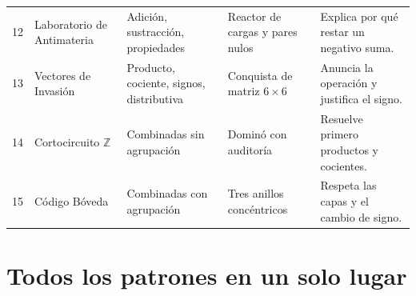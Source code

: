 \documentclass[12pt, letterpaper]{article}
\newcommand{\Z}{\mathbb{Z}}
\begin{document}
\begin{center}
\begin{tabular}{@{}c l p{3.0cm} p{3.4cm} p{3.6cm}@{}}
12 & Laboratorio de Antimateria & Adición, sustracción, propiedades & Reactor de cargas y pares nulos & Explica por qué restar un negativo suma.\\
13 & Vectores de Invasión & Producto, cociente, signos, distributiva & Conquista de matriz $6\times 6$ & Anuncia la operación y justifica el signo.\\
14 & Cortocircuito $\Z$ & Combinadas sin agrupación & Dominó con auditoría & Resuelve primero productos y cocientes.\\
15 & Código Bóveda & Combinadas con agrupación & Tres anillos concéntricos & Respeta las capas y el cambio de signo.\\
\bottomrule
\end{tabular}
\end{center}

\section{Todos los patrones en un solo lugar}
\end{document}
